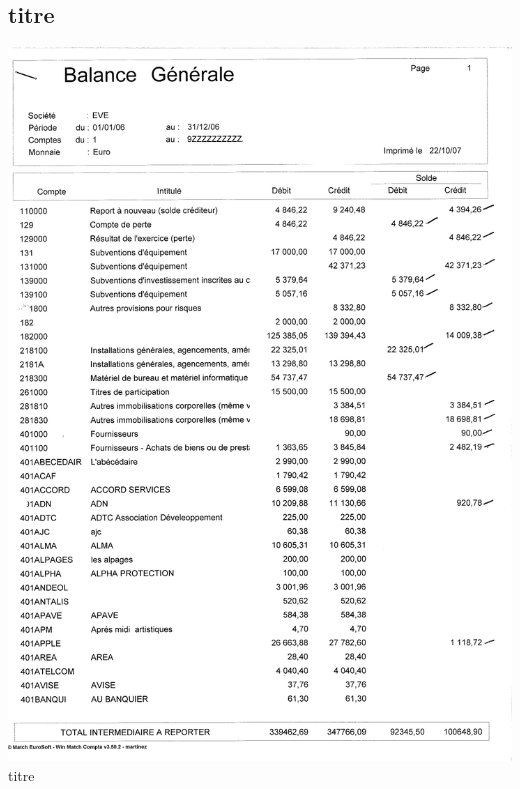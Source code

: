 \subsection{titre}
\begin{center}
\includegraphics[scale=0.6]{annexes/images/bilan_annuel_balance_generale.pdf} \\
titre
\end{center}
